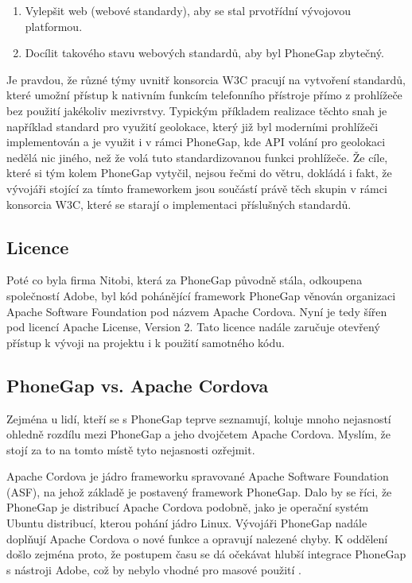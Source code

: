 \begin{enumerate}
	\item Vylepšit web (webové standardy), aby se stal prvotřídní vývojovou platformou.
	\item Docílit takového stavu webových standardů, aby byl PhoneGap zbytečný.
\end{enumerate}

Je pravdou, že různé týmy uvnitř konsorcia W3C pracují na vytvoření standardů, které umožní přístup k nativním funkcím telefonního přístroje přímo z prohlížeče bez použití jakékoliv mezivrstvy. Typickým příkladem realizace těchto snah je například standard pro využití geolokace, který již byl moderními prohlížeči implementován a je využit i v rámci PhoneGap, kde API volání pro geolokaci nedělá nic jiného, než že volá tuto standardizovanou funkci prohlížeče. Že cíle, které si tým kolem PhoneGap vytyčil, nejsou řečmi do větru, dokládá i fakt, že vývojáři stojící za tímto frameworkem jsou součástí právě těch skupin v rámci konsorcia W3C, které se starají o implementaci příslušných standardů.

\subsection{Licence}
Poté co byla firma Nitobi, která za PhoneGap původně stála, odkoupena společností Adobe, byl kód pohánějící framework PhoneGap věnován organizaci Apache Software Foundation pod názvem Apache Cordova. Nyní je tedy šířen pod licencí Apache License, Version 2. Tato licence nadále zaručuje otevřený přístup k vývoji na projektu i k použití samotného kódu.

\subsection{PhoneGap vs. Apache Cordova}
Zejména u lidí, kteří se s PhoneGap teprve seznamují, koluje mnoho nejasností ohledně rozdílu mezi PhoneGap a jeho dvojčetem Apache Cordova. Myslím, že stojí za to na tomto místě tyto nejasnosti ozřejmit.

Apache Cordova je jádro frameworku spravované Apache Software Foundation (ASF), na jehož základě je postavený framework PhoneGap. Dalo by se říci, že PhoneGap je distribucí Apache Cordova podobně, jako je operační systém Ubuntu distribucí, kterou pohání jádro Linux. Vývojáři PhoneGap nadále doplňují Apache Cordova o nové funkce a opravují nalezené chyby. K oddělení došlo zejména proto, že postupem času se dá očekávat hlubší integrace PhoneGap s nástroji Adobe, což by nebylo vhodné pro masové použití \cite{cordova_name}. 

